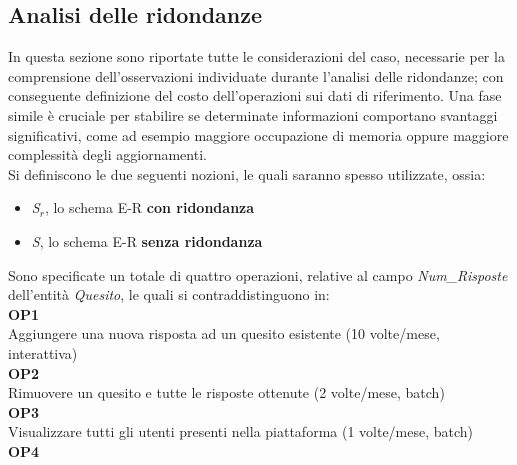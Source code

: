 \documentclass{article}
\begin{document}
\subsection{Analisi delle ridondanze}
\large
In questa sezione sono riportate tutte le considerazioni del caso, necessarie per la comprensione dell'osservazioni individuate durante l'analisi delle ridondanze; con conseguente definizione del costo dell'operazioni sui dati di riferimento. Una fase simile è cruciale per stabilire se determinate informazioni comportano svantaggi significativi, come ad esempio maggiore occupazione di memoria oppure maggiore complessità degli aggiornamenti.\vspace{7pt}\\
Si definiscono le due seguenti nozioni, le quali saranno spesso utilizzate, ossia:
\begin{itemize}[label={-}]
    \itemsep0em
    \item \textit{S$_r$}, lo schema E-R \textbf{con ridondanza}
    \item \textit{S}, \hspace{1px} lo schema E-R \textbf{senza ridondanza}
\end{itemize}
\vspace*{7pt}
Sono specificate un totale di quattro operazioni, relative al campo \textit{Num\_Risposte} dell'entità \textit{Quesito}, le quali si contraddistinguono in: \vspace*{7pt}\\
\hspace*{5pt}\textbf{OP1} \\
\hspace*{5pt}Aggiungere una nuova risposta ad un quesito esistente (10 volte/mese, interattiva) \vspace*{7pt}\\
\hspace*{5pt}\textbf{OP2} \\
\hspace*{5pt}Rimuovere un quesito e tutte le risposte ottenute (2 volte/mese, batch) \vspace*{7pt}\\
\hspace*{5pt}\textbf{OP3} \\
\hspace*{5pt}Visualizzare tutti gli utenti presenti nella piattaforma (1 volte/mese, batch) \vspace*{7pt}\\
\hspace*{5pt}\textbf{OP4} \\
\end{document}
